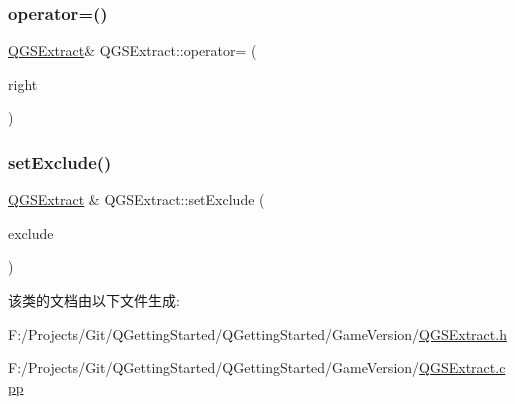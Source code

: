 \mbox{\label{class_q_g_s_extract_a8c59b0c27634fecb2da35a69ec924986}} 
\subsubsection{\texorpdfstring{operator=()}{operator=()}\hspace{0.1cm}{\footnotesize\ttfamily [2/2]}}
{\footnotesize\ttfamily \mbox{\hyperlink{class_q_g_s_extract}{Q\+G\+S\+Extract}}\& Q\+G\+S\+Extract\+::operator= (\begin{DoxyParamCaption}\item[{\mbox{\hyperlink{class_q_g_s_extract}{Q\+G\+S\+Extract}} \&\&}]{right }\end{DoxyParamCaption})\hspace{0.3cm}{\ttfamily [default]}}

\mbox{\label{class_q_g_s_extract_a86ab3efd2c110b2951f455cee4d6edb1}} 
\subsubsection{\texorpdfstring{set\+Exclude()}{setExclude()}}
{\footnotesize\ttfamily \mbox{\hyperlink{class_q_g_s_extract}{Q\+G\+S\+Extract}} \& Q\+G\+S\+Extract\+::set\+Exclude (\begin{DoxyParamCaption}\item[{const Q\+String\+List \&}]{exclude }\end{DoxyParamCaption})}



该类的文档由以下文件生成\+:\begin{DoxyCompactItemize}
\item 
F\+:/\+Projects/\+Git/\+Q\+Getting\+Started/\+Q\+Getting\+Started/\+Game\+Version/\mbox{\hyperlink{_q_g_s_extract_8h}{Q\+G\+S\+Extract.\+h}}\item 
F\+:/\+Projects/\+Git/\+Q\+Getting\+Started/\+Q\+Getting\+Started/\+Game\+Version/\mbox{\hyperlink{_q_g_s_extract_8cpp}{Q\+G\+S\+Extract.\+cpp}}\end{DoxyCompactItemize}

